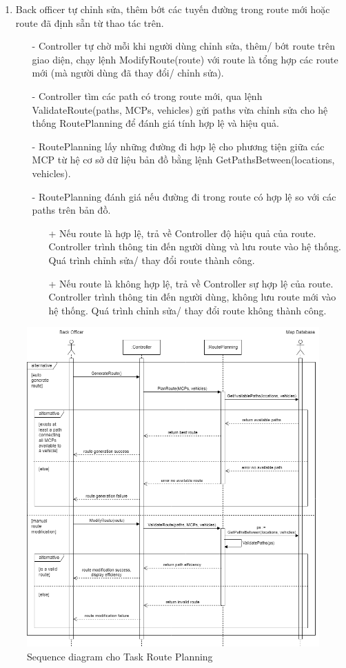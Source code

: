 \begin{enumerate}
        \item Back officer tự chỉnh sửa, thêm bớt các tuyến đường trong route mới hoặc route đã định sẵn từ thao tác trên.
        \begin{itemize}
            \item[-] Controller tự chờ mỗi khi người dùng chỉnh sửa, thêm/ bớt route trên giao diện, chạy lệnh ModifyRoute(route) với route là tổng hợp các route mới (mà người dùng đã thay đổi/ chỉnh sửa).
            \item[-] Controller tìm các path có trong route mới, qua lệnh ValidateRoute(paths, MCPs, vehicles) gửi paths vừa chỉnh sửa cho hệ thống RoutePlanning để đánh giá tính hợp lệ và hiệu quả.
            \item[-] RoutePlanning lấy những đường đi hợp lệ cho phương tiện giữa các MCP từ hệ cơ sở dữ liệu bản đồ bằng lệnh GetPathsBetween(locations, vehicles).
            \item[-] RoutePlanning đánh giá nếu đường đi trong route có hợp lệ so với các paths trên bản đồ.
            \begin{itemize}
                \item[+] Nếu route là hợp lệ, trả về Controller độ hiệu quả của route. Controller trình thông tin đến người dùng và lưu route vào hệ thống. Quá trình chỉnh sửa/ thay đổi route thành công.
                \item[+] Nếu route là không hợp lệ, trả về Controller sự hợp lệ của route. Controller trình thông tin đến người dùng, không lưu route mới vào hệ thống. Quá trình chỉnh sửa/ thay đổi route không thành công.
            \end{itemize}
        \end{itemize}
    \end{enumerate}

    \begin{figure}[H]
        \centering
        \includegraphics[width=1\linewidth]{imgs/sequence diagram/Sequence Diagram 2.2.png}
        \caption{Sequence diagram cho Task Route Planning}
    \end{figure}
    
    \newpage
